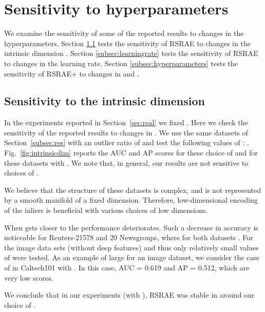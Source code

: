 \documentclass{article} \usepackage{iclr2020_conference,times}
\def\Secref#1{Section~\ref{#1}}
\begin{document}
\newpage
\section{Sensitivity to hyperparameters}
\label{sec:sensitivity}

We examine the sensitivity of some of the reported results to changes in the hyperparameters. Section \ref{subsec:intrinsicdim} tests the sensitivity of RSRAE to changes in the intrinsic dimension .
Section \ref{subsec:learningrate} tests the sensitivity of RSRAE to changes in the learning rate. 
Section \ref{subsec:hyperparameters} tests the sensitivity of RSRAE+ to changes in  and . 



\subsection{Sensitivity to the intrinsic dimension}
\label{subsec:intrinsicdim}

In the experiments reported in \Secref{sec:real} we fixed . Here we check the sensitivity of the reported results to changes in .
We use the same datasets of \Secref{subsec:res} with an outlier ratio of  and test the following values of : .  Fig.~\ref{fig:intrinsicdim} reports the AUC and AP scores for these choice of  and for these datasets with . 
We note that, in general, our results are not  sensitive to choices of .

We believe that the structure of these datasets is complex, and is not represented by a smooth manifold of a fixed dimension. Therefore, low-dimensional encoding of the inliers is beneficial with various choices of low dimensions. 

When  gets closer to  the performance deteriorates. Such a decrease in accuracy is noticeable for Reuters-21578 and 20 Newsgroups, where for both datasets . For the image data sets (without deep features)  and thus only relatively small values of  were tested. As an example of large  for an image dataset, we consider the case of  in Caltech101 with . In this case, AUC = 0.619 and AP = 0.512, which are very low scores. 


We conclude that in our experiments (with ), RSRAE was stable in  around our choice of . 
\end{document}

